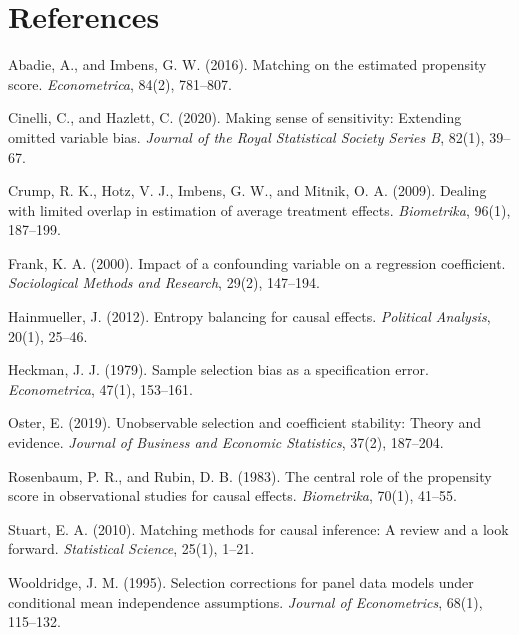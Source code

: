 \documentclass[11pt]{article}
\begin{document}
\section*{References}
\small
\begin{description}\setlength{\itemsep}{2pt}
\item Abadie, A., and Imbens, G. W. (2016). Matching on the estimated propensity score. \textit{Econometrica}, 84(2), 781--807.
\item Cinelli, C., and Hazlett, C. (2020). Making sense of sensitivity: Extending omitted variable bias. \textit{Journal of the Royal Statistical Society Series B}, 82(1), 39--67.
\item Crump, R. K., Hotz, V. J., Imbens, G. W., and Mitnik, O. A. (2009). Dealing with limited overlap in estimation of average treatment effects. \textit{Biometrika}, 96(1), 187--199.
\item Frank, K. A. (2000). Impact of a confounding variable on a regression coefficient. \textit{Sociological Methods and Research}, 29(2), 147--194.
\item Hainmueller, J. (2012). Entropy balancing for causal effects. \textit{Political Analysis}, 20(1), 25--46.
\item Heckman, J. J. (1979). Sample selection bias as a specification error. \textit{Econometrica}, 47(1), 153--161.
\item Oster, E. (2019). Unobservable selection and coefficient stability: Theory and evidence. \textit{Journal of Business and Economic Statistics}, 37(2), 187--204.
\item Rosenbaum, P. R., and Rubin, D. B. (1983). The central role of the propensity score in observational studies for causal effects. \textit{Biometrika}, 70(1), 41--55.
\item Stuart, E. A. (2010). Matching methods for causal inference: A review and a look forward. \textit{Statistical Science}, 25(1), 1--21.
\item Wooldridge, J. M. (1995). Selection corrections for panel data models under conditional mean independence assumptions. \textit{Journal of Econometrics}, 68(1), 115--132.
\end{description}
\end{document}
